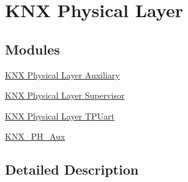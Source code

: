 \hypertarget{group___k_n_x___p_h}{}\section{K\+NX Physical Layer}
\label{group___k_n_x___p_h}
\subsection*{Modules}
\begin{DoxyCompactItemize}
\item 
\hyperlink{group___k_n_x___aux}{K\+N\+X Physical Layer Auxiliary}
\item 
\hyperlink{group___k_n_x___p_h___sup}{K\+N\+X Physical Layer Supervisor}
\item 
\hyperlink{group___k_n_x___p_h___t_p_uart}{K\+N\+X Physical Layer T\+P\+Uart}
\item 
\hyperlink{group___k_n_x___p_h___aux}{K\+N\+X\+\_\+\+P\+H\+\_\+\+Aux}
\end{DoxyCompactItemize}


\subsection{Detailed Description}
